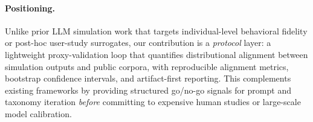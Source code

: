 \paragraph{Positioning.}
Unlike prior LLM simulation work that targets individual-level behavioral fidelity or post-hoc user-study surrogates, our contribution is a \emph{protocol} layer: a lightweight proxy-validation loop that quantifies distributional alignment between simulation outputs and public corpora, with reproducible alignment metrics, bootstrap confidence intervals, and artifact-first reporting.
This complements existing frameworks by providing structured go/no-go signals for prompt and taxonomy iteration \emph{before} committing to expensive human studies or large-scale model calibration.
